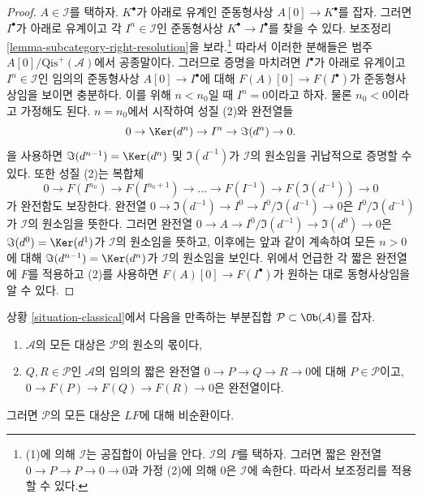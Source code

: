 \begin{proof}
$A \in \mathcal{I}$를 택하자. $K^\bullet$가 아래로 유계인 준동형사상
$A[0] \to K^\bullet$를 잡자. 그러면 $I^\bullet$가 아래로 유계이고
각 $I^n \in \mathcal{I}$인 준동형사상
$K^\bullet \to I^\bullet$를 찾을 수 있다. 보조정리
\ref{lemma-subcategory-right-resolution}을 보라.\footnote{(1)에 의해
$\mathcal{I}$는 공집합이 아님을 안다. $\mathcal{I}$의 $P$를 택하자.
그러면 짧은 완전열 $0 \to P \to P \to 0 \to 0$과 가정 (2)에 의해
$0$은 $\mathcal{I}$에 속한다. 따라서 보조정리를 적용할 수 있다.}
따라서 이러한 분해들은 범주 $A[0]/\text{Qis}^{+}(\mathcal{A})$에서
공종말이다. 그러므로 증명을 마치려면 $I^\bullet$가 아래로 유계이고
$I^n \in \mathcal{I}$인 임의의 준동형사상 $A[0] \to I^\bullet$에 대해
$F(A)[0] \to F(I^\bullet)$가 준동형사상임을 보이면 충분하다.
이를 위해 $n < n_0$일 때 $I^n = 0$이라고 하자. 물론
$n_0 < 0$이라고 가정해도 된다. $n = n_0$에서 시작하여 성질 (2)와
완전열들
$$
0 \to \Ker(d^n) \to I^n \to \Im(d^n) \to 0.
$$
을 사용하면 $\Im(d^{n - 1}) = \Ker(d^n)$ 및 $\Im(d^{-1})$가
$\mathcal{I}$의 원소임을 귀납적으로 증명할 수 있다.
또한 성질 (2)는 복합체
$$
0 \to F(I^{n_0}) \to F(I^{n_0 + 1}) \to \ldots \to F(I^{-1}) \to
F(\Im(d^{-1})) \to 0
$$
가 완전함도 보장한다. 완전열
$0 \to \Im(d^{-1}) \to I^0 \to I^0/\Im(d^{-1}) \to 0$은
$I^0/\Im(d^{-1})$가 $\mathcal{I}$의 원소임을 뜻한다.
그러면 완전열 $0 \to A \to I^0/\Im(d^{-1}) \to \Im(d^0) \to 0$은
$\Im(d^0) = \Ker(d^1)$가 $\mathcal{I}$의 원소임을 뜻하고, 이후에는
앞과 같이 계속하여 모든 $n > 0$에 대해
$\Im(d^{n - 1}) = \Ker(d^n)$가 $\mathcal{I}$의 원소임을 보인다.
위에서 언급한 각 짧은 완전열에 $F$를 적용하고 (2)를 사용하면
$F(A)[0] \to F(I^\bullet)$가 원하는 대로 동형사상임을 알 수 있다.
\end{proof}

\begin{lemma}
\label{lemma-subcategory-left-acyclics}
상황 \ref{situation-classical}에서 다음을 만족하는 부분집합
$\mathcal{P} \subset \Ob(\mathcal{A})$를 잡자.
\begin{enumerate}
\item $\mathcal{A}$의 모든 대상은 $\mathcal{P}$의 원소의 몫이다,
\item $Q, R \in \mathcal{P}$인 $\mathcal{A}$의 임의의 짧은 완전열
$0 \to P \to Q \to R \to 0$에 대해 $P \in \mathcal{P}$이고,
$0 \to F(P) \to F(Q) \to F(R) \to 0$은 완전열이다.
\end{enumerate}
그러면 $\mathcal{P}$의 모든 대상은 $LF$에 대해 비순환이다.
\end{lemma}

